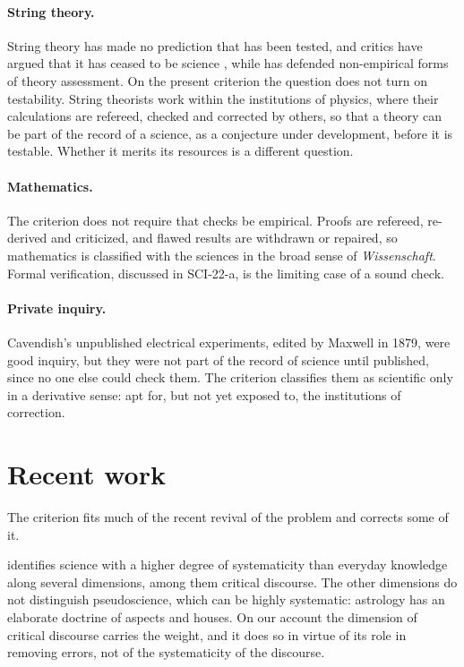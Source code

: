 \documentclass{situationist-preprint}
\begin{document}
\paragraph{String theory.} String theory has made no prediction that has been tested, and critics have argued that it has ceased to be science \citep{EllisSilk2014}, while \citet{Dawid2013} has defended non-empirical forms of theory assessment. On the present criterion the question does not turn on testability. String theorists work within the institutions of physics, where their calculations are refereed, checked and corrected by others, so that a theory can be part of the record of a science, as a conjecture under development, before it is testable. Whether it merits its resources is a different question.

\paragraph{Mathematics.} The criterion does not require that checks be empirical. Proofs are refereed, re-derived and criticized, and flawed results are withdrawn or repaired, so mathematics is classified with the sciences in the broad sense of \emph{Wissenschaft}. Formal verification, discussed in SCI-22-a, is the limiting case of a sound check.

\paragraph{Private inquiry.} Cavendish's unpublished electrical experiments, edited by Maxwell in 1879, were good inquiry, but they were not part of the record of science until published, since no one else could check them. The criterion classifies them as scientific only in a derivative sense: apt for, but not yet exposed to, the institutions of correction.

\section{Recent work}\label{s:recent}

The criterion fits much of the recent revival of the problem and corrects some of it.

\citet{HoyningenHuene2013} identifies science with a higher degree of systematicity than everyday knowledge along several dimensions, among them critical discourse. The other dimensions do not distinguish pseudoscience, which can be highly systematic: astrology has an elaborate doctrine of aspects and houses. On our account the dimension of critical discourse carries the weight, and it does so in virtue of its role in removing errors, not of the systematicity of the discourse.
\end{document}
